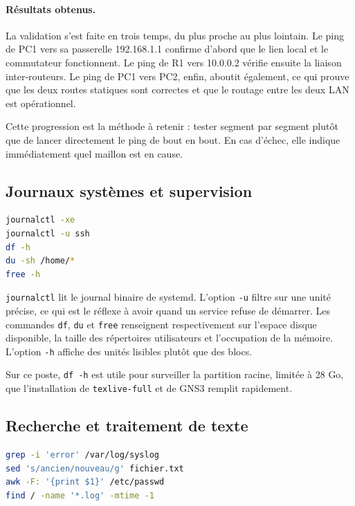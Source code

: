 \documentclass[11pt,a4paper]{article}
\begin{document}
\paragraph{R\'esultats obtenus.}
La validation s'est faite en trois temps, du plus proche au plus lointain. Le ping de PC1 vers sa passerelle
192.168.1.1 confirme d'abord que le lien local et le commutateur fonctionnent. Le ping de R1 vers 10.0.0.2
v\'erifie ensuite la liaison inter-routeurs. Le ping de PC1 vers PC2, enfin, aboutit \'egalement, ce qui
prouve que les deux routes statiques sont correctes et que le routage entre les deux LAN est
op\'erationnel.

Cette progression est la m\'ethode \`a retenir : tester segment par segment plut\^ot que de lancer
directement le ping de bout en bout. En cas d'\'echec, elle indique imm\'ediatement quel maillon est en
cause.

\subsection{Journaux syst\`emes et supervision}

\begin{lstlisting}[language=bash]
journalctl -xe
journalctl -u ssh
df -h
du -sh /home/*
free -h
\end{lstlisting}

\texttt{journalctl} lit le journal binaire de systemd. L'option \texttt{-u} filtre sur une unit\'e pr\'ecise,
ce qui est le r\'eflexe \`a avoir quand un service refuse de d\'emarrer. Les commandes \texttt{df},
\texttt{du} et \texttt{free} renseignent respectivement sur l'espace disque disponible, la taille des
r\'epertoires utilisateurs et l'occupation de la m\'emoire. L'option \texttt{-h} affiche des unit\'es
lisibles plut\^ot que des blocs.

Sur ce poste, \texttt{df -h} est utile pour surveiller la partition racine, limit\'ee \`a 28 Go, que
l'installation de \texttt{texlive-full} et de GNS3 remplit rapidement.

\subsection{Recherche et traitement de texte}

\begin{lstlisting}[language=bash]
grep -i 'error' /var/log/syslog
sed 's/ancien/nouveau/g' fichier.txt
awk -F: '{print $1}' /etc/passwd
find / -name '*.log' -mtime -1
\end{lstlisting}
\end{document}
